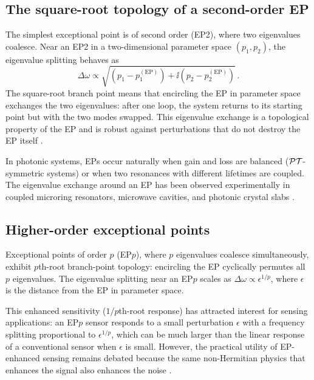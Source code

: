 \subsection{The square-root topology of a second-order EP}
\label{sec:ch17-ep2-topology}

The simplest exceptional point is of second order (EP2), where two
eigenvalues coalesce.  Near an EP2 in a two-dimensional parameter
space $(p_1,p_2)$, the eigenvalue splitting behaves as
\begin{equation}\label{eq:ch17-ep2-splitting}
  \Delta\omega \propto \sqrt{(p_1-p_1^{(\mathrm{EP})})
  + \ii(p_2-p_2^{(\mathrm{EP})})}\,.
\end{equation}
The square-root branch point means that encircling the EP in parameter
space exchanges the two eigenvalues: after one loop, the system
returns to its starting point but with the two modes swapped.  This
eigenvalue exchange is a topological property of the EP and is robust
against perturbations that do not destroy the EP itself
\cite{ding2022non,kawabata2019classification}.

In photonic systems, EPs occur naturally when gain and loss are
balanced ($\mathcal{PT}$-symmetric systems) or when two resonances with
different lifetimes are coupled.  The eigenvalue exchange around an EP
has been observed experimentally in coupled microring resonators,
microwave cavities, and photonic crystal slabs
\cite{longhi2018parity,chong2010symmetry}.

\subsection{Higher-order exceptional points}
\label{sec:ch17-higher-ep}

Exceptional points of order $p$ (EP$p$), where $p$ eigenvalues
coalesce simultaneously, exhibit $p$th-root branch-point topology:
encircling the EP cyclically permutes all $p$ eigenvalues.  The
eigenvalue splitting near an EP$p$ scales as
$\Delta\omega \propto \epsilon^{1/p}$, where $\epsilon$ is the
distance from the EP in parameter space.

This enhanced sensitivity ($1/p$th-root response) has attracted
interest for sensing applications: an EP$p$ sensor responds to a
small perturbation $\epsilon$ with a frequency splitting proportional
to $\epsilon^{1/p}$, which can be much larger than the linear
response of a conventional sensor when $\epsilon$ is small.  However,
the practical utility of EP-enhanced sensing remains debated because
the same non-Hermitian physics that enhances the signal also
enhances the noise \cite{wang2020petermann,ding2022non}.

